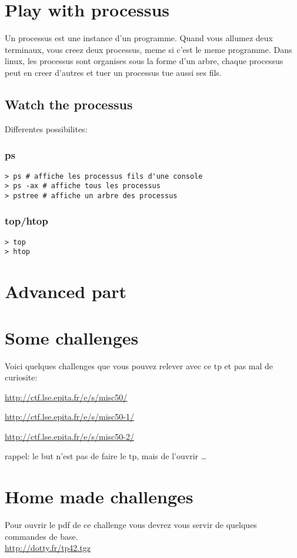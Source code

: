 \documentclass[a4paper]{article}
\begin{document}
\section{Play with processus}
Un processus est une instance d'un programme. Quand vous allumez deux terminaux,
vous creez deux processus, meme si c'est le meme programme. Dans linux, les
processus sont organises sous la forme d'un arbre, chaque processus peut en
creer d'autres et tuer un processus tue aussi ses fils.
\subsection{Watch the processus}
Differentes possibilites:
\subsubsection{ps}
\begin{lstlisting}
> ps # affiche les processus fils d'une console
> ps -ax # affiche tous les processus
> pstree # affiche un arbre des processus
\end{lstlisting}
\subsubsection{top/htop}
\begin{lstlisting}
> top
> htop
\end{lstlisting}
\section{Advanced part}

\section{Some challenges}
Voici quelques challenges que vous pouvez relever avec ce tp et pas mal de
curiosite:

\url{http://ctf.lse.epita.fr/e/s/misc50/}

\url{http://ctf.lse.epita.fr/e/s/misc50-1/}

\url{http://ctf.lse.epita.fr/e/s/misc50-2/} \
\

rappel: le but n'est pas de faire le tp, mais de l'ouvrir \dots


\section{Home made challenges}

Pour ouvrir le pdf de ce challenge vous devrez vous servir de quelques commandes de base.\\


\url{http://dotty.fr/tp42.tgz}
\end{document}
